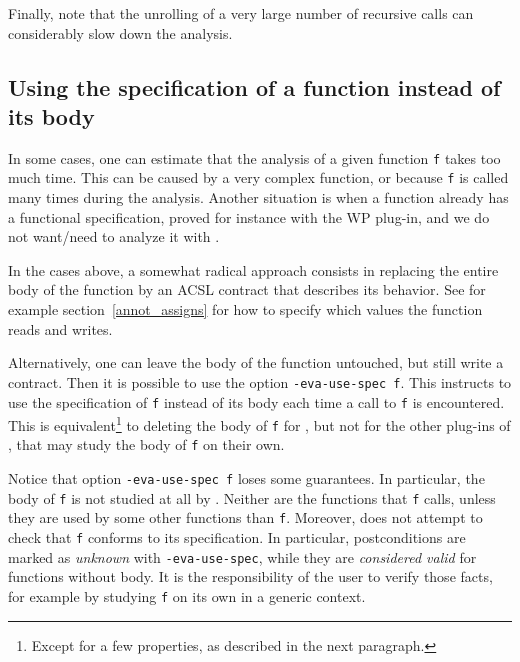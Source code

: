 \documentclass{frama-c-book}
\begin{document}

Finally, note that the unrolling of a very large number of recursive calls can
considerably slow down the analysis.


\subsection{Using the specification of a function instead of its body}
\label{val-use-spec}

In some cases, one can estimate that the analysis of a given function \verb+f+
takes too much time. This can be caused by a very complex
function, or because \verb+f+ is called many times during the analysis.
Another situation is when a function already has a functional specification,
proved for instance with the \textsf{WP} plug-in, and we do not want/need
to analyze it with \Eva{}.

In the cases above, a somewhat radical
approach consists in replacing the entire body of the function
by an ACSL contract that describes its behavior. See for example
section~\ref{annot_assigns} for how to specify which values the function
reads and writes.

Alternatively, one can leave the body of the function untouched, but
still write a contract. Then it is possible to use the option
\verb+-eva-use-spec f+. This instructs \Eva{} to use the
specification of \verb+f+ instead of its body each time a call to
\verb+f+ is encountered. This is equivalent\footnote{Except for a few
  properties, as described in the next paragraph.} to deleting the body
of \verb+f+ for \Eva{}, but not for the other plug-ins of \FramaC,
that may study the body of \verb+f+ on their own.

Notice that option \verb+-eva-use-spec f+ loses some guarantees. In particular,
the body of \verb+f+ is not studied at all by \Eva{}. Neither
are the functions that \verb+f+ calls, unless they are used by some other
functions than \verb+f+. Moreover, \Eva{} does not attempt
to check that \verb+f+ conforms to its specification. In particular,
postconditions are marked as {\em unknown} with \verb+-eva-use-spec+,
while they are {\em considered valid} for functions without body.
It is the responsibility
of the user to verify those facts, for example by studying \verb+f+
on its own in a generic context.



%
\end{document}
